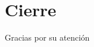 \documentclass[10pt, aspectratio=169]{beamer}
\begin{document}
\section{Cierre}

\begin{frame}{}

\huge Gracias por su atención
\end{frame}
\end{document}
